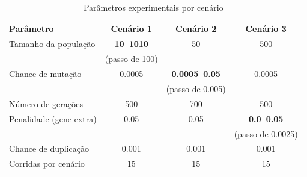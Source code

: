 \begin{table}[h]
    \centering
    \caption{Parâmetros experimentais por cenário}
    \label{tab:cenarios}
    \begin{tabular}{lccc}
        \toprule
        \textbf{Parâmetro} & \textbf{Cenário 1} & \textbf{Cenário 2} & \textbf{Cenário 3} \\
        \midrule
        Tamanho da população & \textbf{10--1010} & 50 & 500 \\
        & \small{(passo de 100)} & & \\
        \addlinespace
        Chance de mutação & 0.0005 & \textbf{0.0005--0.05} & 0.0005 \\
        & & \small{(passo de 0.005)} & \\
        \addlinespace
        Número de gerações & 500 & 700 & 500 \\
        \addlinespace
        Penalidade (gene extra) & 0.05 & 0.05 & \textbf{0.0--0.05} \\
        & & & \small{(passo de 0.0025)} \\
        \addlinespace
        Chance de duplicação & 0.001 & 0.001 & 0.001 \\
        \addlinespace
        Corridas por cenário & 15 & 15 & 15 \\
        \bottomrule
    \end{tabular}
\end{table}
